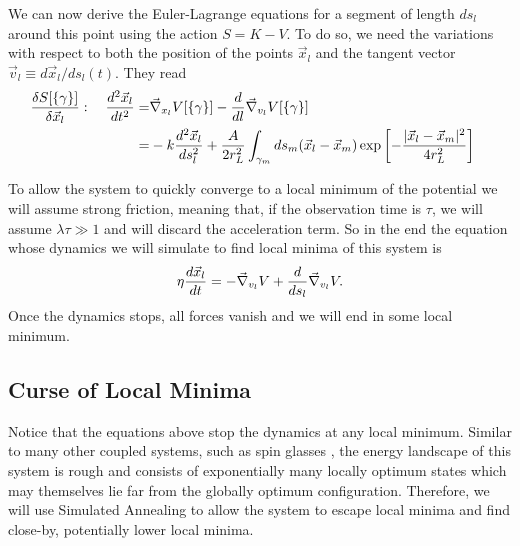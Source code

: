 \documentclass[endfloats,nofootinbib,preprint,floatfix,titlepage,superscriptaddress]{revtex4} %
\newcommand{\outNim}[1]{}
\begin{document}
\outNim{
{
\color{red} !!! Needs correction!!!}
\[K_l [\gamma_l]\equiv \int_{\gamma_l} dl \left|d^2 \vec{x}_l \over dt dl\right|^2.\]
} %

We can now derive the Euler-Lagrange equations for a segment of length $ds_l$ around this point using the action $S = K- V$. To do so, we need the variations with respect to both the position of the points $\vec{x}_l$ and the tangent vector $\vec{v}_l \equiv  d\vec{x}_l/ds_l(t)$. They read 
\begin{align} 
{\delta S[\{\gamma\}] \over \delta \vec{x}_l} : \quad {d^2 \vec{x}_l \over dt^2 }  
=&  \vec{\nabla}_{{x}_l} V[\{\gamma\}]- {d\over dl} \vec{\nabla}_{{v}_l} V[\{\gamma\}] \cr
=& -k {d^2\vec{x}_l\over ds_l^2} + {A\over 2 r_L^2}\int_{\gamma_m} ds_m
 (\vec{x}_l-\vec{x}_m)\exp\left[- {|\vec{x}_l-\vec{x}_m|^2 \over 4 r_L^2}\right]
\end{align}


To allow the system to quickly converge to a local minimum of the potential we will assume strong friction, meaning that, if the observation time is $\tau$, we will assume $\lambda \tau \gg 1$ and will discard the acceleration term. So in the end the equation whose dynamics we will simulate to find local minima of this system is 
\begin{equation}
\eta {d \vec{x}_l \over dt }  
= - \vec{\nabla}_{{v}_l} V + {d\over ds_l} \vec{\nabla}_{{v}_l} V\label{eq:Langevin1}.
\end{equation}
Once the dynamics stops, all forces vanish and we will end in some local minimum. 


\subsection{Curse of Local Minima \label{ap:np}}
Notice that the equations above stop the dynamics at any local minimum. 
Similar to many other coupled systems, such as spin glasses \citep{parisi2002physical,pelissetto2002critical}, the energy landscape of this system is rough and consists of exponentially many locally optimum states which may themselves lie far from the globally optimum configuration. 
Therefore, we will use Simulated Annealing to allow the system to escape local minima and find close-by, potentially lower local minima.  
\end{document}
